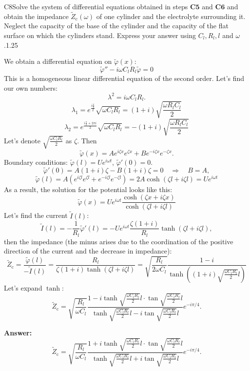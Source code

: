 \documentclass[11pt,a4paper]{article}
\begin{document}
\begin{solcard}{C8}{Solve the system of differential equations obtained in steps $\textbf{C5}$ and $\textbf{C6}$ and obtain the impedance $\tilde{Z}_\text{c}(\omega)$ of one cylinder and the electrolyte surrounding it. Neglect the capacity of the base of the cylinder and the capacity of the flat surface on which the cylinders stand. Express your answer using $C_l,R_l,l$ and $\omega$.}{1.25}

We obtain a differential equation on $\tilde{\varphi}(x)$: \[ \tilde{\varphi}'' - i \omega C_l R_l \tilde{\varphi} = 0 \] This is a homogeneous linear differential equation of the second order. Let's find our own numbers: \[ \lambda^2 = i \omega C_l R_l. \] \[ \lambda_1 = e^{\frac{i \frac{\pi}{2}}{2}} \sqrt{\omega C_l R_l} = (1+i) \sqrt{\frac{\omega R_l C_l}{2}} \] \[ \lambda_2 = e^{\frac{i \frac{\pi}{2}+2\pi i}{2}} \sqrt{\omega C_l R_l} = -(1+i) \sqrt{\frac{\omega R_l C_l}{2}} \] Let's denote $\sqrt{\frac{\omega C_l R_l}{2}}$ as $\zeta$. Then \[ \tilde{\varphi}(x) = A e^{i \zeta x} e^{\zeta x} + B e^{-i \zeta x} e^{-\zeta x}.\] Boundary conditions: $\tilde{\varphi}(l)=Ue^{i \omega t}$, $\tilde{\varphi}'(0) = 0$. \[ \tilde{\varphi}'(0) = A(1+i) \zeta - B(1+i)\zeta = 0 \quad \Rightarrow \quad B = A,\] \[ \tilde{\varphi}(l) = A \left( e^{i \zeta l} e^{\zeta l} + e^{-i \zeta l} e^{-\zeta l} \right) = 2A \cosh(\zeta l + i \zeta l) = U e^{i \omega t} \] As a result, the solution for the potential looks like this: \[ \tilde{\varphi}(x) = U e^{i \omega t} \frac{ \cosh(\zeta x+i \zeta x)}{\cosh(\zeta l+ i \zeta l)}\] Let's find the current $\tilde{I}(l)$: \[ \tilde{I}(l) = -\frac{1}{R_l} \tilde{\varphi}'(l) = -U e^{i \omega t} \frac{\zeta (1+i)}{R_l} \tanh(\zeta l+ i \zeta l), \] then the impedance (the minus arises due to the coordination of the positive direction of the current and the decrease in impedance): \[\tilde{Z}_\text{c} = \frac{\tilde{\varphi}(l)}{-\tilde{I}(l)}= \frac{R_l}{\zeta (1+i) \tanh (\zeta l + i \zeta l) } = \sqrt{\frac{R_l}{2\omega C_l}} \frac{1-i}{\tanh \left( (1+i) \sqrt{\frac{\omega C_l R_l}{2}} l \right)} \] Let's expand $\tanh$: \[\tilde{Z}_\text{c} = \sqrt{\frac{R_l}{\omega C_l}} \frac{1 - i\tanh \sqrt{\frac{\omega C_l R_l}{2}} l \cdot \tan \sqrt{\frac{\omega C_l R_l}{2}} l}{\tanh \sqrt{\frac{\omega C_l R_l}{2}} l - i\tan \sqrt{\frac{\omega C_l R_l}{2}} l}  e^{-i\pi/4}. \]

\par\smallskip\noindent\textbf{Answer:} \[\tilde{Z}_\text{c} = \sqrt{\frac{R_l}{\omega C_l}} \frac{1 + i\tanh \sqrt{\frac{\omega C_l R_l}{2}} l \cdot \tan \sqrt{\frac{\omega C_l R_l}{2}} l} {\tanh \sqrt{\frac{\omega C_l R_l}{2}} l + i\tan \sqrt{\frac{\omega C_l R_l}{2}} l}  e^{-i\pi/4}. \]
\end{solcard}
\end{document}
